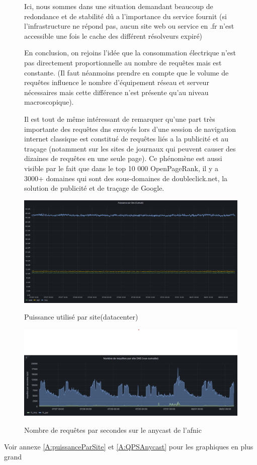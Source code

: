 \begin{figure}[ht]
  \noindent
  \begin{minipage}{.55\textwidth}
Ici, nous sommes dans une situation demandant beaucoup de redondance et de stabilité dû a l'importance du service fournit (si l'infrastructure ne répond pas, aucun site web ou service en .fr n'est accessible une fois le cache des différent résolveurs expiré)

En conclusion, on rejoins l'idée que la consommation électrique n'est pas directement proportionnelle au nombre de requêtes mais est constante.
(Il faut néanmoins prendre en compte que le volume de requêtes influence le nombre d'équipement réseau et serveur nécessaires mais cette différence n'est présente qu'au niveau macroscopique). \cite{blogStephaneConsoElec}

Il est tout de même intéressant de remarquer qu'une part très importante des requêtes dns envoyés lors d'une session de navigation internet classique est constitué de requêtes liés a la publicité et au traçage (notamment sur les sites de journaux qui peuvent causer des dizaines de requêtes en une seule page). Ce phénomène est aussi visible par le fait que dans le top 10 000 OpenPageRank, il y a 3000+ domaines qui sont des sous-domaines de doubleclick.net, la solution de publicité et de traçage de Google. \cite{openPageRank}
  \end{minipage}
  \hfill
  \begin{minipage}{.40\textwidth}
    \centering
      \includegraphics[width=\textwidth]{paper/figures/puissanceParSite.png}
      \caption{Puissance utilisé par site(datacenter)}
      \label{fig:puissanceSite}
  \centering
      \includegraphics[width=\textwidth]{paper/figures/qpsAnycast.png}
      \caption{Nombre de requêtes par secondes sur le \gls{anycast} de l'afnic}
      \label{fig:QPSAnycast}
  \end{minipage}
\end{figure}

Voir annexe \ref{A:puissanceParSite} et \ref{A:QPSAnycast} pour les graphiques en plus grand